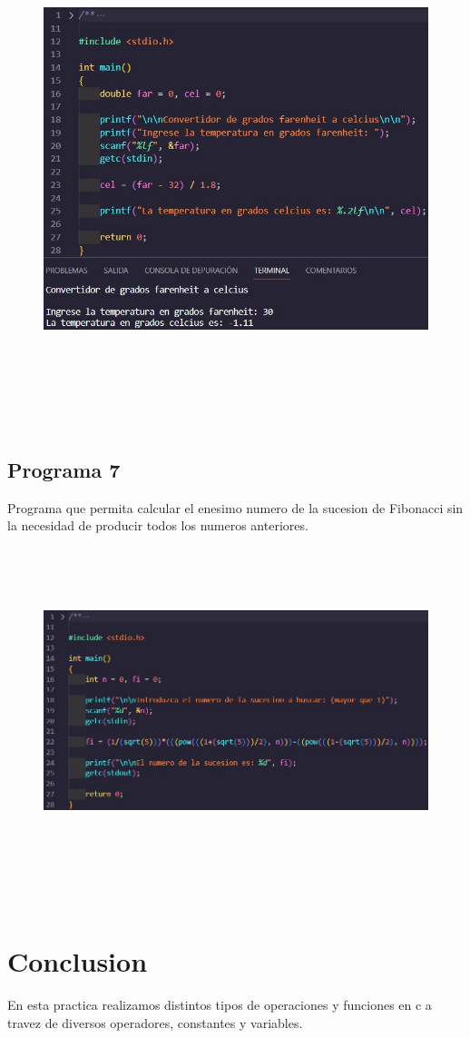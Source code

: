 \documentclass{article}
\begin{document}
\begin{figure}[H]
    \centering
    \includegraphics[height = 15cm]{img6.jpg}
\end{figure}

\newpage

\subsection{Programa 7}

Programa que permita calcular el enesimo numero de la sucesion de Fibonacci sin la necesidad de producir todos los numeros anteriores.

\begin{figure}[H]
    \centering
    \includegraphics[height = 9.5cm]{img7.jpg}
\end{figure}

\
\
\
\

\section{Conclusion}

En esta practica realizamos distintos tipos de operaciones y funciones en c a travez de diversos operadores, constantes y variables.
\end{document}
